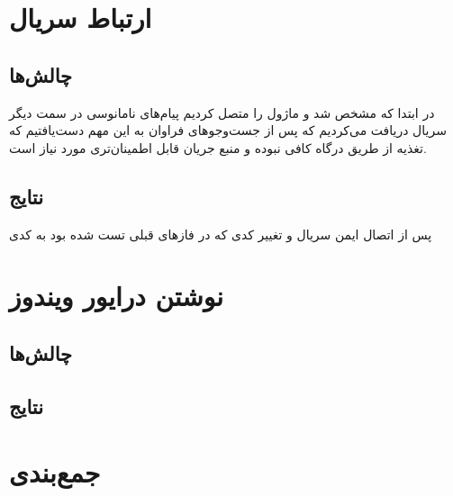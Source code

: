 \documentclass{article}
\begin{document}
\section{ارتباط سریال}
\subsection{چالش‌ها}
در ابتدا که  مشخص شد و ماژول  را متصل کردیم  پیام‌های نامانوسی در سمت دیگر سریال
دریافت می‌کردیم که پس از جست‌و‌جوهای فراوان به این مهم دست‌یافتیم که تغذیه از طریق درگاه 
کافی نبوده و منبع جریان قابل اطمینان‌تری مورد نیاز است.

\subsection{نتایج}
پس از اتصال ایمن سریال و تغییر کدی که در فازهای قبلی تست شده بود به کدی 


\section{نوشتن درایور ویندوز}
\subsection{چالش‌ها}

\subsection{نتایج}



\section{جمع‌بندی}
\end{document}
